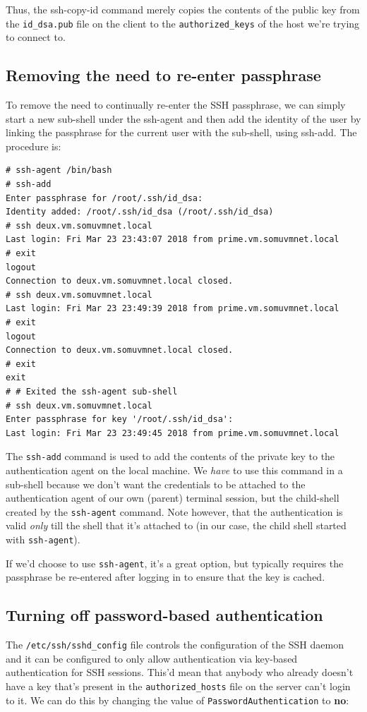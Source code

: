 \noindent
Thus, the ssh-copy-id command merely copies the contents of the public key from the \verb|id_dsa.pub| file on the client to the \verb|authorized_keys| of the host we're trying to connect to. 

\subsection{Removing the need to re-enter passphrase}
To remove the need to continually re-enter the SSH passphrase, we can simply start a new sub-shell under the ssh-agent and then add the identity of the user by linking the passphrase for the current user with the sub-shell, using ssh-add. The procedure is:

\vspace{-15pt}
\begin{verbatim}
# ssh-agent /bin/bash
# ssh-add
Enter passphrase for /root/.ssh/id_dsa: 
Identity added: /root/.ssh/id_dsa (/root/.ssh/id_dsa)
# ssh deux.vm.somuvmnet.local 
Last login: Fri Mar 23 23:43:07 2018 from prime.vm.somuvmnet.local
# exit
logout
Connection to deux.vm.somuvmnet.local closed.
# ssh deux.vm.somuvmnet.local 
Last login: Fri Mar 23 23:49:39 2018 from prime.vm.somuvmnet.local
# exit
logout
Connection to deux.vm.somuvmnet.local closed.
# exit
exit
# # Exited the ssh-agent sub-shell
# ssh deux.vm.somuvmnet.local 
Enter passphrase for key '/root/.ssh/id_dsa': 
Last login: Fri Mar 23 23:49:45 2018 from prime.vm.somuvmnet.local
\end{verbatim}
\vspace{-10pt}	

\noindent
The \verb|ssh-add| command is used to add the contents of the private key to the authentication agent on the local machine. We \textit{have} to use this command in a sub-shell because we don't want the credentials to be attached to the authentication agent of our own (parent) terminal session, but the child-shell created by the \verb|ssh-agent| command. Note however, that the authentication is valid \textit{only} till the shell that it's attached to (in our case, the child shell started with \verb|ssh-agent|).

If we'd choose to use \verb|ssh-agent|, it's a great option, but typically requires the passphrase be re-entered after logging in to ensure that the key is cached. 

\subsection{Turning off password-based authentication} 
The \verb|/etc/ssh/sshd_config| file controls the configuration of the SSH daemon and it can be configured to only allow authentication via key-based authentication for SSH sessions. This'd mean that anybody who already doesn't have a key that's present in the \verb|authorized_hosts| file on the server can't login to it. We can do this by changing the value of \verb|PasswordAuthentication| to \textbf{no}:

